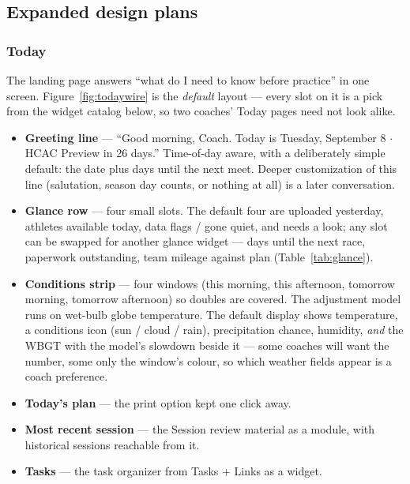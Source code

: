 \documentclass[11pt]{article}
\begin{document}
\subsection{Expanded design plans}
\label{sec:expanded}

\subsubsection{Today}

The landing page answers ``what do I need to know before practice'' in one
screen. Figure~\ref{fig:todaywire} is the \emph{default} layout --- every slot
on it is a pick from the widget catalog below, so two coaches' Today pages
need not look alike.

\begin{itemize}
  \item \textbf{Greeting line} --- ``Good morning, Coach. Today is Tuesday,
    September 8 $\cdot$ HCAC Preview in 26 days.'' Time-of-day aware, with a
    deliberately simple default: the date plus days until the next meet.
    Deeper customization of this line (salutation, season day counts, or
    nothing at all) is a later conversation.
  \item \textbf{Glance row} --- four small slots. The default four are
    uploaded yesterday, athletes available today, data flags / gone quiet,
    and needs a look; any slot can be swapped for another glance widget ---
    days until the next race, paperwork outstanding, team mileage against
    plan (Table~\ref{tab:glance}).
  \item \textbf{Conditions strip} --- four windows (this morning, this
    afternoon, tomorrow morning, tomorrow afternoon) so doubles are covered.
    The adjustment model runs on wet-bulb globe temperature. The default
    display shows temperature, a conditions icon (sun / cloud / rain),
    precipitation chance, humidity, \emph{and} the WBGT with the model's
    slowdown beside it --- some coaches will want the number, some only the
    window's colour, so which weather fields appear is a coach preference.
  \item \textbf{Today's plan} --- the print option kept one click away.
  \item \textbf{Most recent session} --- the Session review material as a
    module, with historical sessions reachable from it.
  \item \textbf{Tasks} --- the task organizer from Tasks + Links as a widget.
\end{itemize}
\end{document}
